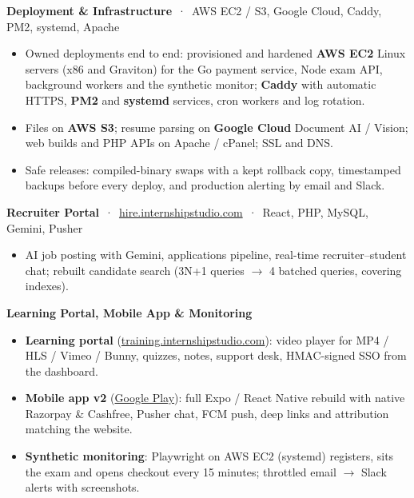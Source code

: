 \documentclass[10pt,a4paper]{article}
\newcommand{\link}[2]{\href{#1}{\color{teal}#2}}
\begin{document}
\textbf{Deployment \& Infrastructure} \,·\, {\small AWS EC2 / S3, Google Cloud, Caddy, PM2, systemd, Apache}
\begin{itemize}
  \item Owned deployments end to end: provisioned and hardened \textbf{AWS EC2} Linux servers (x86 and Graviton) for the Go payment service, Node exam API,
        background workers and the synthetic monitor; \textbf{Caddy} with automatic HTTPS, \textbf{PM2} and \textbf{systemd} services, cron workers and log rotation.
  \item Files on \textbf{AWS S3}; resume parsing on \textbf{Google Cloud} Document AI / Vision; web builds and PHP APIs on Apache / cPanel; SSL and DNS.
  \item Safe releases: compiled-binary swaps with a kept rollback copy, timestamped backups before every deploy, and production alerting by email and Slack.
\end{itemize}

\textbf{Recruiter Portal} \,·\, \link{https://hire.internshipstudio.com}{hire.internshipstudio.com} \,·\, {\small React, PHP, MySQL, Gemini, Pusher}
\begin{itemize}
  \item AI job posting with Gemini, applications pipeline, real-time recruiter--student chat; rebuilt candidate search (3N+1 queries $\rightarrow$ 4 batched queries, covering indexes).
\end{itemize}

\textbf{Learning Portal, Mobile App \& Monitoring}
\begin{itemize}
  \item \textbf{Learning portal} (\link{https://training.internshipstudio.com}{training.internshipstudio.com}): video player for MP4 / HLS / Vimeo / Bunny, quizzes, notes, support desk, HMAC-signed SSO from the dashboard.
  \item \textbf{Mobile app v2} (\link{https://play.google.com/store/apps/details?id=com.istudio.app}{Google Play}): full Expo / React Native rebuild with native Razorpay \& Cashfree, Pusher chat, FCM push, deep links and attribution matching the website.
  \item \textbf{Synthetic monitoring}: Playwright on AWS EC2 (systemd) registers, sits the exam and opens checkout every 15 minutes; throttled email $\rightarrow$ Slack alerts with screenshots.
\end{itemize}
\end{document}

